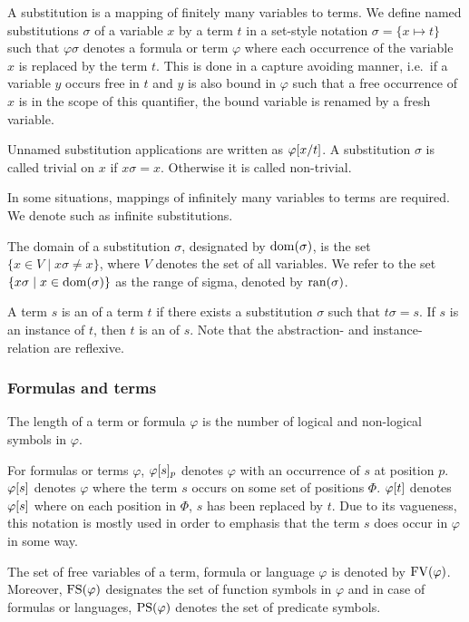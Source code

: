 A substitution is a mapping of finitely many variables to terms.
We define named substitutions $\sigma$ of a variable $x$ by a term $t$ in a set-style notation $\sigma = \{ x \mapsto t\}$ such that 
$\varphi\sigma$ denotes a formula or term $\varphi$ where each occurrence of the variable $x$ is replaced by the term $t$.
This is done in a capture avoiding manner, i.e.\ if a variable $y$ occurs free in $t$ and $y$ is also bound in $\varphi$ such that a free occurrence of $x$ is in the scope of this quantifier, the bound variable is renamed by a fresh variable.

Unnamed substitution applications are written as $\varphi[x/t]$.
A substitution $\sigma$ is called trivial on $x$ if $x\sigma = x$. Otherwise it is called non-trivial.

In some situations, mappings of infinitely many variables to terms are required. We denote such as infinite substitutions.

The domain of a substitution $\sigma$, designated by $\operatorname{dom}(\sigma)$, is the set $\{x \in V \mid x\sigma \neq x\}$, where $V$ denotes the set of all variables.
We refer to the set $\{x\sigma \mid x\in \operatorname{dom}(\sigma)\}$ as the range of sigma, denoted by $\operatorname{ran}(\sigma)$.



A term $s$ is an  of a term $t$ if there exists a substitution $\sigma$ such that $t\sigma = s$.
If $s$ is an instance of $t$, then $t$ is an  of $s$. Note that the abstraction- and instance-relation are reflexive. 

\subsubsection*{Formulas and terms}
The length of a term or formula $\varphi$ is the number of logical and non-logical symbols in $\varphi$.

For formulas or terms $\varphi$, $\varphi{\ensuremath{[s]}_{p}}$ denotes $\varphi$ with an occurrence of $s$ at position $p$.
$\varphi[s]$ denotes $\varphi$ where the term $s$ occurs on some set of positions $\Phi$. $\varphi[t]$ denotes $\varphi[s]$ where on each position in $\Phi$, $s$ has been replaced by $t$. Due to its vagueness, this notation is mostly used in order to emphasis that the term $s$ does occur in $\varphi$ in some way.

The set of free variables of a term, formula or language $\varphi$ is denoted by $\operatorname{FV}(\varphi)$.
Moreover,
$\operatorname{FS}(\varphi)$ designates the set of function symbols in $\varphi$ and in case of formulas or languages, $\operatorname{PS}(\varphi)$ denotes the set of predicate symbols.


